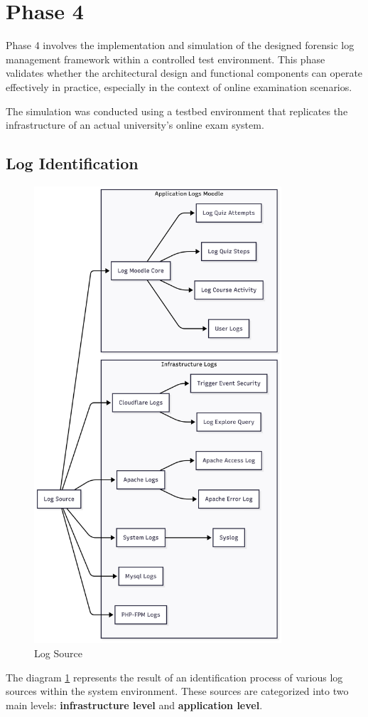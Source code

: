 \section{Phase 4}
Phase 4 involves the implementation and simulation of the designed forensic log management framework within a controlled test environment. This phase validates whether the architectural design and functional components can operate effectively in practice, especially in the context of online examination scenarios.

The simulation was conducted using a testbed environment that replicates the infrastructure of an actual university's online exam system.

\subsection{Log Identification}
\begin{figure}[H] 
	\centering
	\includegraphics[height=17cm]{figure/log-source.png}
	\caption{Log Source}
	\label{fig:log-source}
\end{figure}
The diagram \ref{fig:log-source} represents the result of an identification process of various log sources within the system environment. These sources are categorized into two main levels: \textbf{infrastructure level} and \textbf{application level}.


